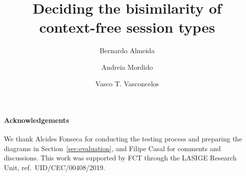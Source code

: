 \documentclass[orivec,runningheads]{llncs}
\begin{document}
\title{Deciding the bisimilarity of context-free session types
}


\author{Bernardo Almeida \and
Andreia Mordido \and
Vasco T. Vasconcelos}

%
%



%
%
%


\maketitle










\paragraph{Acknowledgements}
  We thank Alcides Fonseca for conducting the testing process and
  preparing the diagrams in Section~\ref{sec:evaluation}, and Filipe
  Casal for comments and discussions.
%
  This work was supported by FCT through the LASIGE Research Unit,
  ref.\ UID/CEC/00408/2019.




\newpage 
\appendix
%
%
%
%
%
\end{document}
